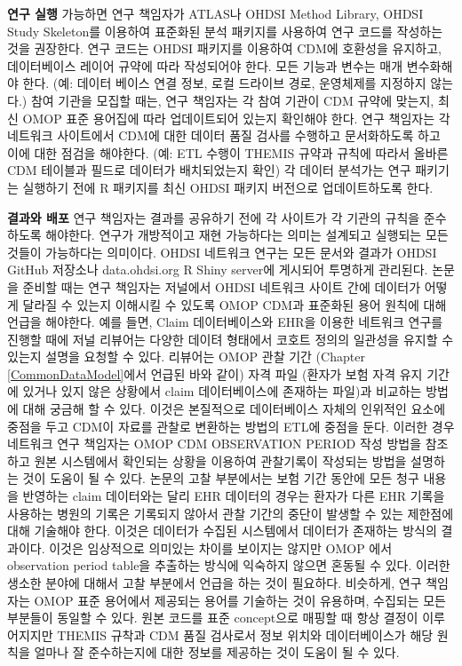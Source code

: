 \documentclass[11pt]{book}
\theoremstyle{definition}
\theoremstyle{definition}
\theoremstyle{definition}
\theoremstyle{remark}
\begin{document}
\textbf{연구 실행} 가능하면 연구 책임자가 ATLAS나 OHDSI Method Library,
OHDSI Study Skeleton를 이용하여 표준화된 분석 패키지를 사용하여 연구
코드를 작성하는 것을 권장한다. 연구 코드는 OHDSI 패키지를 이용하여 CDM에
호환성을 유지하고, 데이터베이스 레이어 규약에 따라 작성되어야 한다. 모든
기능과 변수는 매개 변수화해야 한다. (예: 데이터 베이스 연결 정보, 로컬
드라이브 경로, 운영체제를 지정하지 않는다.) 참여 기관을 모집할 때는,
연구 책임자는 각 참여 기관이 CDM 규약에 맞는지, 최신 OMOP 표준 용어집에
따라 업데이트되어 있는지 확인해야 한다. 연구 책임자는 각 네트워크
사이트에서 CDM에 대한 데이터 품질 검사를 수행하고 문서화하도록 하고 이에
대한 점검을 해야한다. (예: ETL 수행이 THEMIS 규약과 규칙에 따라서 올바른
CDM 테이블과 필드로 데이터가 배치되었는지 확인) 각 데이터 분석가는 연구
패키기는 실행하기 전에 R 패키지를 최신 OHDSI 패키지 버전으로
업데이트하도록 한다.

\textbf{결과와 배포} 연구 책임자는 결과를 공유하기 전에 각 사이트가 각
기관의 규칙을 준수하도록 해야한다. 연구가 개방적이고 재현 가능하다는
의미는 설계되고 실행되는 모든 것들이 가능하다는 의미이다. OHDSI 네트워크
연구는 모든 문서와 결과가 OHDSI GitHub 저장소나 data.ohdsi.org R Shiny
server에 게시되어 투명하게 관리된다. 논문을 준비할 때는 연구 책임자는
저널에서 OHDSI 네트워크 사이트 간에 데이터가 어떻게 달라질 수 있는지
이해시킬 수 있도록 OMOP CDM과 표준화된 용어 원칙에 대해 언급을 해야한다.
예를 들면, Claim 데이터베이스와 EHR을 이용한 네트워크 연구를 진행할 때에
저널 리뷰어는 다양한 데이텨 형태에서 코호트 정의의 일관성을 유지할 수
있는지 설명을 요청할 수 있다. 리뷰어는 OMOP 관찰 기간 (Chapter
\ref{CommonDataModel}에서 언급된 바와 같이) 자격 파일 (환자가 보험 자격
유지 기간에 있거나 있지 않은 상황에서 claim 데이터베이스에 존재하는
파일)과 비교하는 방법에 대해 궁금해 할 수 있다. 이것은 본질적으로
데이터베이스 자체의 인위적인 요소에 중점을 두고 CDM이 자료를 관찰로
변환하는 방법의 ETL에 중점을 둔다. 이러한 경우 네트워크 연구 책임자는
OMOP CDM OBSERVATION PERIOD 작성 방법을 참조하고 원본 시스템에서
확인되는 상황을 이용하여 관찰기록이 작성되는 방법을 설명하는 것이 도움이
될 수 있다. 논문의 고찰 부분에서는 보험 기간 동안에 모든 청구 내용을
반영하는 claim 데이터와는 달리 EHR 데이터의 경우는 환자가 다른 EHR
기록을 사용하는 병원의 기록은 기록되지 않아서 관찰 기간의 중단이 발생할
수 있는 제한점에 대해 기술해야 한다. 이것은 데이터가 수집된 시스템에서
데이터가 존재하는 방식의 결과이다. 이것은 임상적으로 의미있는 차이를
보이지는 않지만 OMOP 에서 observation period table을 추출하는 방식에
익숙하지 않으면 혼동될 수 있다. 이러한 생소한 분야에 대해서 고찰
부분에서 언급을 하는 것이 필요하다. 비슷하게, 연구 책임자는 OMOP 표준
용어에서 제공되는 용어를 기술하는 것이 유용하며, 수집되는 모든 부분들이
동일할 수 있다. 원본 코드를 표준 concept으로 매핑할 때 항상 결정이
이루어지지만 THEMIS 규착과 CDM 품질 검사로서 정보 위치와 데이터베이스가
해당 원칙을 얼마나 잘 준수하는지에 대한 정보를 제공하는 것이 도움이 될
수 있다.
\end{document}
